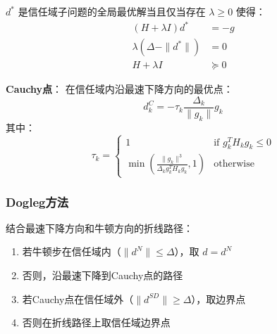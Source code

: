 \begin{theorem}[子问题最优性条件]
$d^*$ 是信任域子问题的全局最优解当且仅当存在 $\lambda \geq 0$ 使得：
\begin{align}
(H + \lambda I)d^* &= -g \\
\lambda(\Delta - \|d^*\|) &= 0 \\
H + \lambda I &\succeq 0
\end{align}
\end{theorem}

\textbf{Cauchy点}：
在信任域内沿最速下降方向的最优点：
\[
d_k^C = -\tau_k \frac{\Delta_k}{\|g_k\|} g_k
\]
其中：
\[
\tau_k = \begin{cases} 1 & \text{if } g_k^T H_k g_k \leq 0 \\ \min\left(\frac{\|g_k\|^3}{\Delta_k g_k^T H_k g_k}, 1\right) & \text{otherwise} \end{cases}
\]

\subsubsection{Dogleg方法}

\begin{conceptbox}[Dogleg方法]
结合最速下降方向和牛顿方向的折线路径：
\begin{enumerate}
    \item 若牛顿步在信任域内（$\|d^N\| \leq \Delta$），取 $d = d^N$
    \item 否则，沿最速下降到Cauchy点的路径
    \item 若Cauchy点在信任域外（$\|d^{SD}\| \geq \Delta$），取边界点
    \item 否则在折线路径上取信任域边界点
\end{enumerate}
\end{conceptbox}

